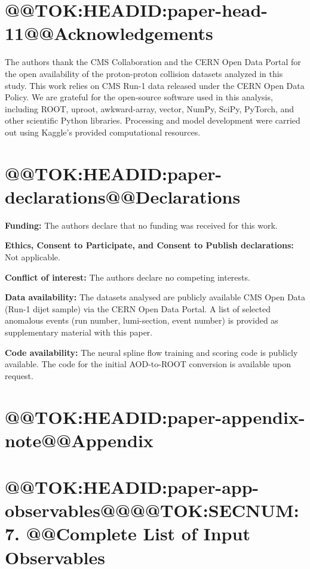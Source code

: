 \documentclass[11pt]{article}
\begin{document}
\section*{@@TOK:HEADID:paper-head-11@@Acknowledgements}

The authors thank the CMS Collaboration and the CERN Open Data Portal for the open availability of the proton-proton collision datasets analyzed in this study. This work relies on CMS Run-1 data released under the CERN Open Data Policy. We are grateful for the open-source software used in this analysis, including ROOT, uproot, awkward-array, vector, NumPy, SciPy, PyTorch, and other scientific Python libraries. Processing and model development were carried out using Kaggle's provided computational resources.

\section*{@@TOK:HEADID:paper-declarations@@Declarations}


\noindent\textbf{Funding:} The authors declare that no funding was received for this work.

\noindent\textbf{Ethics, Consent to Participate, and Consent to Publish declarations:} Not applicable.

\noindent\textbf{Conflict of interest:} The authors declare no competing interests.

\noindent\textbf{Data availability:} The datasets analysed are publicly available CMS Open Data (Run-1 dijet sample) via the CERN Open Data Portal. A list of selected anomalous events (run number, lumi-section, event number) is provided as supplementary material with this paper.

\noindent\textbf{Code availability:} The neural spline flow training and scoring code is publicly available. The code for the initial AOD-to-ROOT conversion is available upon request.



\section*{@@TOK:HEADID:paper-appendix-note@@Appendix}


\section{@@TOK:HEADID:paper-app-observables@@@@TOK:SECNUM:7. @@Complete List of Input Observables}
\end{document}
